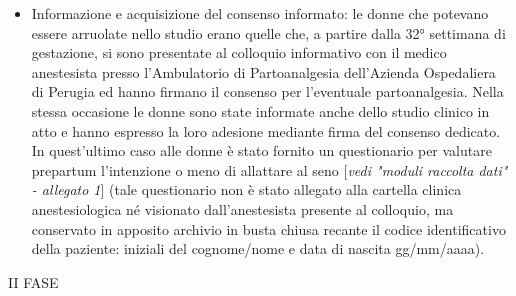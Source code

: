 \documentclass[]{article}
\begin{document}
\begin{itemize}
\item
  {Informazione e acquisizione del consenso informato}: le donne che
  potevano essere arruolate nello studio erano quelle che, a partire
  dalla 32° settimana di gestazione, si sono presentate al colloquio
  informativo con il medico anestesista presso l'Ambulatorio di
  Partoanalgesia dell'Azienda Ospedaliera di Perugia ed hanno firmano il
  consenso per l'eventuale partoanalgesia. Nella stessa occasione le
  donne sono state informate anche dello studio clinico in atto e hanno
  espresso la loro adesione mediante firma del consenso dedicato. In
  quest'ultimo caso alle donne è stato fornito un questionario per
  valutare prepartum l'intenzione o meno di allattare al seno
  {[}\emph{vedi "moduli raccolta dati" - allegato 1}{]} (tale
  questionario non è stato allegato alla cartella clinica
  anestesiologica né visionato dall'anestesista presente al colloquio,
  ma conservato in apposito archivio in busta chiusa recante il codice
  identificativo della paziente: iniziali del cognome/nome e data di
  nascita gg/mm/aaaa).
\end{itemize}

{II FASE}
\end{document}
